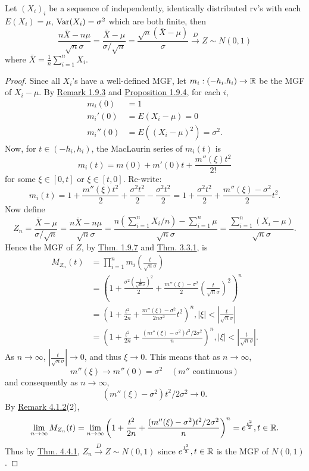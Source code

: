 \documentclass[11pt,fleqn]{book} %
\begin{document}
\begin{theorem}
\label{thm:443}
Let \((X_i)_i\) be a sequence of independently, identically distributed rv's with each \(E(X_i) = \mu\), \(\operatorname{Var}(X_i) = \sigma^2\) which are both finite, then
\[
\frac{n\bar{X} - n\mu}{\sqrt{n}\sigma} = \frac{\bar{X} - \mu}{\sigma/\sqrt{n}} = \frac{\sqrt{n}(\bar{X} - \mu)}{\sigma} \xrightarrow{D} Z \sim N(0, 1)
\]
where \(\bar{X} = \frac1n\sum_{i=1}^n X_i\).
\end{theorem}
\begin{proof}
Since all \(X_i\)'s have a well-defined MGF, let \(m_i: (-h_i. h_i)\rightarrow\mathbb{R}\) be the MGF of \(X_i - \mu\). By \hyperref[rmk:193]{Remark 1.9.3} and \hyperref[prop:194]{Proposition 1.9.4}, for each \(i\),
\[
\begin{aligned}
m_i(0) &= 1 \\
m_i'(0) &= E(X_i - \mu) = 0 \\
m_i''(0) &= E((X_i - \mu)^2) = \sigma^2.
\end{aligned}
\]
\indent Now, for \(t \in (-h_i, h_i)\), the MacLaurin series of \(m_i(t)\) is
\[
m_i(t) = m(0) + m'(0)t + \frac{m''(\xi)t^2}{2!}
\]
for some \(\xi \in [0, t]\) or \(\xi \in [t, 0]\). Re-write:
\[
m_i(t) = 1 + \frac{m''(\xi)t^2}{2} + \frac{\sigma^2t^2}{2} - \frac{\sigma^2t^2}{2} = 1 + \frac{\sigma^2t^2}{2} + \frac{m''(\xi) - \sigma^2}{2}t^2.
\]
\indent Now define
\[
Z_n = \frac{\bar{X} - \mu}{\sigma / \sqrt{n}} = \frac{n\bar{X} - n\mu}{\sqrt{n}\sigma} = \frac{n(\sum_{i=1}^n X_i / n) - \sum_{i=1}^n \mu}{\sqrt{n}\sigma} = \frac{\sum_{i=1}^n(X_i - \mu)}{\sqrt{n}\sigma}.
\]
\indent Hence the MGF of \(Z\), by \hyperref[thm:197]{Thm. 1.9.7} and \hyperref[thm:331]{Thm. 3.3.1}, is
\[
\begin{aligned}
M_{Z_n}(t) &= \prod_{i=1}^n m_i\left(\frac{t}{\sqrt{n}\sigma}\right) \\
&= \left(1 + \frac{\sigma^2\left(\frac{t}{\sqrt{n}\sigma}\right)^2}{2} + \frac{m''(\xi) - \sigma^2}{2}\left(\frac{t}{\sqrt{n}\sigma}\right)^2\right)^n \\
&= \left(1 + \frac{t^2}{2n} + \frac{m''(\xi) - \sigma^2}{2n\sigma^2}t^2\right)^n, |\xi| < \left|\frac{t}{\sqrt{n}\sigma}\right| \\
&= \left(1 + \frac{t^2}{2n} + \frac{(m''(\xi) - \sigma^2)t^2 / 2\sigma^2}{n}\right)^n, |\xi| < \left|\frac{t}{\sqrt{n}\sigma}\right|.
\end{aligned}
\]
\indent As \(n\rightarrow\infty\), \(\left|\frac{t}{\sqrt{n}\sigma}\right| \rightarrow 0\), and thus \(\xi\rightarrow 0\). This means that as \(n\rightarrow\infty\), 
\[
m''(\xi)\rightarrow m''(0) = \sigma^2 \quad (m'' \text{ continuous})
\]
and consequently as \(n\rightarrow\infty\),
\[
(m''(\xi) - \sigma^2)t^2/2\sigma^2 \rightarrow 0.
\]
\indent By \hyperref[rmk:412]{Remark 4.1.2}(2),
\[
\lim_{n\rightarrow\infty}M_{Z_n}(t) = \lim_{n\rightarrow\infty}\left(1 + \frac{t^2}{2n} + \frac{(m''(\xi) - \sigma^2)t^2 / 2\sigma^2}{n}\right)^n = e^{\frac{t^2}{2}}, t \in \mathbb{R}.
\]
\indent Thus by \hyperref[thm:441]{Thm. 4.4.1}, \(Z_n \xrightarrow{D} Z \sim N(0, 1)\) since \(e^{\frac{t^2}{2}}, t \in \mathbb{R}\) is the MGF of \(N(0, 1)\).
\end{proof}
\end{document}
